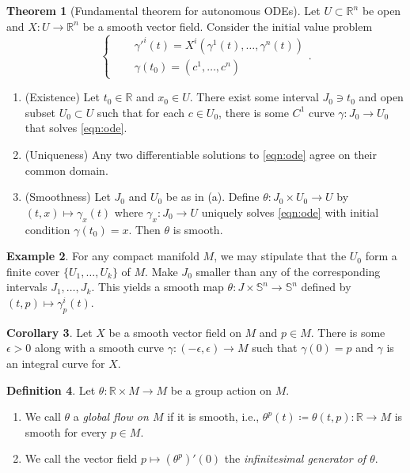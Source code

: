 \documentclass[10pt,letterpaper,cm]{nupset}
\theoremstyle{definition}
\newtheorem{definition}{Definition}[subsection]
\newtheorem{exmp}[definition]{Example}
\theoremstyle{theorem}
\newtheorem{theorem}[definition]{Theorem}
\newtheorem{corollary}[definition]{Corollary}
\theoremstyle{remark}
\newcommand{\R}{\mathbb R}
\renewcommand{\S}{\mathbb S}
\newcommand{\1}{\mathbf{1}}
\newcommand{\0}{\vec 0}
\begin{document}
\begin{theorem}[Fundamental theorem for autonomous ODEs]
Let $U\subset \R^n$ be open and $X: U \to \R^n$ be a smooth vector field.  Consider the initial value problem
\begin{equation}
 \begin{cases}  \label{eqn:ode} 
 & \gamma'^i(t)  = X^i\left(\gamma^1(t), \ldots, \gamma^n(t)\right) \\ \quad  & \gamma(t_0)  =(c^1, \ldots, c^n) 
 \end{cases}.
\end{equation}
\begin{enumerate}[label=(\alph*)]
\item (Existence)  Let $t_0 \in \R$ and $x_0\in U$. There exist some interval $J_0 \ni t_0$ and open subset $U_0 \subset U$ such that for each $c\in U_0$, there is some $C^1$ curve $\gamma : J_0 \to U_0$ that solves  \cref{eqn:ode}.
\item (Uniqueness)  Any two differentiable solutions to  \cref{eqn:ode} agree on their common domain.
\item (Smoothness) Let $J_0$ and $U_0$ be as in (a). Define $\theta : J_0 \times U_0 \to U$ by $(t, x) \mapsto \gamma_x(t)$ where $\gamma_x : J_0 \to U$ uniquely solves  \cref{eqn:ode} with initial condition $\gamma(t_0) = x$. Then $\theta$ is smooth.
\end{enumerate}
\end{theorem}

\begin{exmp}
For any compact manifold $M$, we may stipulate that the $U_0$ form a finite cover $\{U_1, \ldots, U_k\}$ of $M$. Make $J_0$ smaller than any of the corresponding intervals $J_1, \ldots, J_k$. This yields a smooth map $\theta : J \times \S^n \to \S^n$ defined by $\left(t, p\right) \mapsto \gamma_p^i(t)$.
\end{exmp}

\begin{corollary}
Let $X$ be a smooth vector field on $M$ and $p\in M$. There is some $\epsilon >0$ along with a smooth curve $\gamma : ({-\epsilon} , \epsilon) \to M$ such that $\gamma(0)= p$ and $\gamma$ is an integral curve for $X$.
\end{corollary}

\begin{definition}
Let $\theta : \R \times M \to M$ be a group action on $M$. 
\begin{enumerate}
\item We call $\theta$ a \textit{global flow on $M$} if it is smooth, i.e., $\theta^p(t)\coloneqq  \theta(t, p) : \R \to M$ is smooth for every $p\in M$.
\item We call the vector field $p\mapsto  (\theta^p)'(0)$  the \textit{infinitesimal generator of $\theta$}.
\end{enumerate}
\end{definition}
\end{document}
